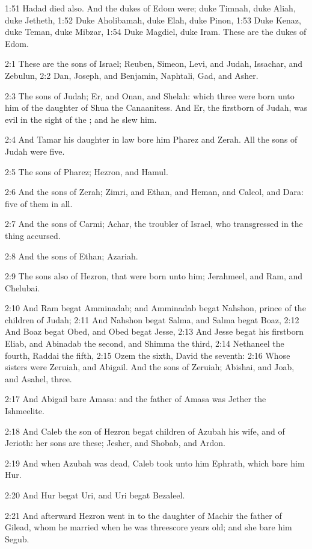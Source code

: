 1:51 Hadad died also. And the dukes of Edom were; duke Timnah, duke Aliah, duke Jetheth, 1:52 Duke Aholibamah, duke Elah, duke Pinon, 1:53 Duke Kenaz, duke Teman, duke Mibzar, 1:54 Duke Magdiel, duke Iram.  These are the dukes of Edom.

2:1 These are the sons of Israel; Reuben, Simeon, Levi, and Judah, Issachar, and Zebulun, 2:2 Dan, Joseph, and Benjamin, Naphtali, Gad, and Asher.

2:3 The sons of Judah; Er, and Onan, and Shelah: which three were born unto him of the daughter of Shua the Canaanitess. And Er, the firstborn of Judah, was evil in the sight of the \LORD; and he slew him.

2:4 And Tamar his daughter in law bore him Pharez and Zerah. All the sons of Judah were five.

2:5 The sons of Pharez; Hezron, and Hamul.

2:6 And the sons of Zerah; Zimri, and Ethan, and Heman, and Calcol, and Dara: five of them in all.

2:7 And the sons of Carmi; Achar, the troubler of Israel, who transgressed in the thing accursed.

2:8 And the sons of Ethan; Azariah.

2:9 The sons also of Hezron, that were born unto him; Jerahmeel, and Ram, and Chelubai.

2:10 And Ram begat Amminadab; and Amminadab begat Nahshon, prince of the children of Judah; 2:11 And Nahshon begat Salma, and Salma begat Boaz, 2:12 And Boaz begat Obed, and Obed begat Jesse, 2:13 And Jesse begat his firstborn Eliab, and Abinadab the second, and Shimma the third, 2:14 Nethaneel the fourth, Raddai the fifth, 2:15 Ozem the sixth, David the seventh: 2:16 Whose sisters were Zeruiah, and Abigail. And the sons of Zeruiah; Abishai, and Joab, and Asahel, three.

2:17 And Abigail bare Amasa: and the father of Amasa was Jether the Ishmeelite.

2:18 And Caleb the son of Hezron begat children of Azubah his wife, and of Jerioth: her sons are these; Jesher, and Shobab, and Ardon.

2:19 And when Azubah was dead, Caleb took unto him Ephrath, which bare him Hur.

2:20 And Hur begat Uri, and Uri begat Bezaleel.

2:21 And afterward Hezron went in to the daughter of Machir the father of Gilead, whom he married when he was threescore years old; and she bare him Segub.

